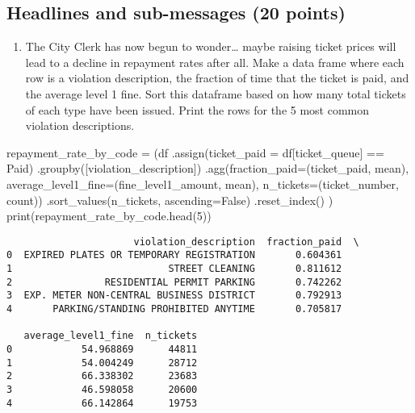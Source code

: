 \documentclass[
  letterpaper,
  DIV=11,
  numbers=noendperiod]{scrartcl}
\newenvironment{Shaded}{\begin{snugshade}}{\end{snugshade}}
\newcommand{\BuiltInTok}[1]{\textcolor[rgb]{0.00,0.23,0.31}{#1}}
\newcommand{\DecValTok}[1]{\textcolor[rgb]{0.68,0.00,0.00}{#1}}
\newcommand{\NormalTok}[1]{\textcolor[rgb]{0.00,0.23,0.31}{#1}}
\newcommand{\OperatorTok}[1]{\textcolor[rgb]{0.37,0.37,0.37}{#1}}
\newcommand{\StringTok}[1]{\textcolor[rgb]{0.13,0.47,0.30}{#1}}
\newcommand{\VariableTok}[1]{\textcolor[rgb]{0.07,0.07,0.07}{#1}}
\providecommand{\tightlist}{%
  \setlength{\itemsep}{0pt}\setlength{\parskip}{0pt}}\usepackage{longtable,booktabs,array}
\begin{document}
\subsection{Headlines and sub-messages (20
points)}\label{headlines-and-sub-messages-20-points}

\begin{enumerate}
\def\labelenumi{\arabic{enumi}.}
\tightlist
\item
  The City Clerk has now begun to wonder\ldots{} maybe raising ticket
  prices will lead to a decline in repayment rates after all. Make a
  data frame where each row is a violation description, the fraction of
  time that the ticket is paid, and the average level 1 fine. Sort this
  dataframe based on how many total tickets of each type have been
  issued. Print the rows for the 5 most common violation descriptions.
\end{enumerate}

\begin{Shaded}
\begin{Highlighting}[]
\NormalTok{repayment\_rate\_by\_code }\OperatorTok{=}\NormalTok{ (df}
\NormalTok{    .assign(ticket\_paid }\OperatorTok{=}\NormalTok{ df[}\StringTok{\textquotesingle{}ticket\_queue\textquotesingle{}}\NormalTok{] }\OperatorTok{==} \StringTok{\textquotesingle{}Paid\textquotesingle{}}\NormalTok{)}
\NormalTok{    .groupby([}\StringTok{\textquotesingle{}violation\_description\textquotesingle{}}\NormalTok{])}
\NormalTok{    .agg(fraction\_paid}\OperatorTok{=}\NormalTok{(}\StringTok{\textquotesingle{}ticket\_paid\textquotesingle{}}\NormalTok{, }\StringTok{\textquotesingle{}mean\textquotesingle{}}\NormalTok{), }
\NormalTok{        average\_level1\_fine}\OperatorTok{=}\NormalTok{(}\StringTok{\textquotesingle{}fine\_level1\_amount\textquotesingle{}}\NormalTok{, }\StringTok{\textquotesingle{}mean\textquotesingle{}}\NormalTok{),}
\NormalTok{        n\_tickets}\OperatorTok{=}\NormalTok{(}\StringTok{\textquotesingle{}ticket\_number\textquotesingle{}}\NormalTok{, }\StringTok{\textquotesingle{}count\textquotesingle{}}\NormalTok{))}
\NormalTok{    .sort\_values(}\StringTok{\textquotesingle{}n\_tickets\textquotesingle{}}\NormalTok{, ascending}\OperatorTok{=}\VariableTok{False}\NormalTok{)}
\NormalTok{    .reset\_index()}
\NormalTok{)}
\BuiltInTok{print}\NormalTok{(repayment\_rate\_by\_code.head(}\DecValTok{5}\NormalTok{))}
\end{Highlighting}
\end{Shaded}

\begin{verbatim}
                      violation_description  fraction_paid  \
0  EXPIRED PLATES OR TEMPORARY REGISTRATION       0.604361   
1                           STREET CLEANING       0.811612   
2                RESIDENTIAL PERMIT PARKING       0.742262   
3  EXP. METER NON-CENTRAL BUSINESS DISTRICT       0.792913   
4       PARKING/STANDING PROHIBITED ANYTIME       0.705817   

   average_level1_fine  n_tickets  
0            54.968869      44811  
1            54.004249      28712  
2            66.338302      23683  
3            46.598058      20600  
4            66.142864      19753  
\end{verbatim}
\end{document}
